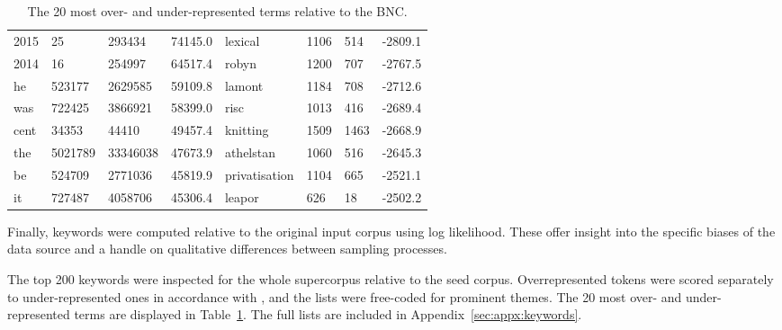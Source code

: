 \begin{table}[Htb]
\begin{tabular}{@{}llll||llll@{}}
        2015       & 25             & 293434          & 74145.0      & lexical       & 1106           & 514             & -2809.1      \\
        2014       & 16             & 254997          & 64517.4      & robyn         & 1200           & 707             & -2767.5      \\
        he         & 523177         & 2629585         & 59109.8      & lamont        & 1184           & 708             & -2712.6      \\
        was        & 722425         & 3866921         & 58399.0      & risc          & 1013           & 416             & -2689.4      \\
        cent       & 34353          & 44410           & 49457.4      & knitting      & 1509           & 1463            & -2668.9      \\
        the        & 5021789        & 33346038        & 47673.9      & athelstan     & 1060           & 516             & -2645.3      \\
        be         & 524709         & 2771036         & 45819.9      & privatisation & 1104           & 665             & -2521.1      \\
        it         & 727487         & 4058706         & 45306.4      & leapor        & 626            & 18              & -2502.2      \\ \hline
    \end{tabular}

    \caption{The 20 most over- and under-represented terms relative to the BNC.}
    \label{table:evaluation:retrieval:keywords}

\end{table}







Finally, keywords were computed relative to the original input corpus using log likelihood.  These offer insight into the specific biases of the data source and a handle on qualitative differences between sampling processes.  



The top 200 keywords were inspected for the whole supercorpus relative to the seed corpus. Overrepresented tokens were scored separately to under-represented ones in accordance with \cite{}, and the lists were free-coded for prominent themes.  The 20 most over- and under-represented terms are displayed in Table~\ref{table:evaluation:retrieval:keywords}.  The full lists are included in Appendix~\ref{sec:appx:keywords}.

